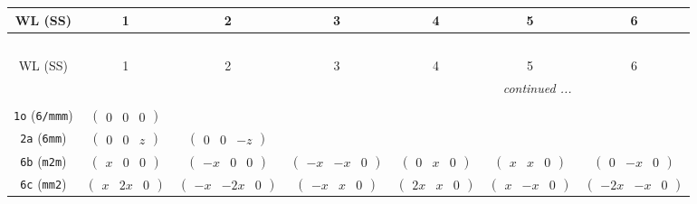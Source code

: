 \documentclass[fleqn,9pt,landscape]{jsarticle}
\begin{document}
\begin{center}
\renewcommand{\arraystretch}{1.2}
\begin{longtable}{ccccccc}
 \hline \hline
WL (SS) & 1 & 2 & 3 & 4 & 5 & 6 \\ \hline \endfirsthead

\multicolumn{6}{l}{\tablename\ \thetable{}} \\
 \hline \hline
WL (SS) & 1 & 2 & 3 & 4 & 5 & 6 \\ \hline \endhead

 \hline \hline
\multicolumn{6}{r}{\footnotesize\it continued ...} \\ \endfoot

 \hline \hline
\multicolumn{6}{r}{} \\ \endlastfoot

{\tt 1o} ({\tt 6/mmm}) & $ \begin{pmatrix} 0 & 0 & 0 \end{pmatrix} $ & $  $ & $  $ & $  $ & $  $ & $  $ \\ \hline
{\tt 2a} ({\tt 6mm}) & $ \begin{pmatrix} 0 & 0 & z \end{pmatrix} $ & $ \begin{pmatrix} 0 & 0 & - z \end{pmatrix} $ & $  $ & $  $ & $  $ & $  $ \\ \hline
{\tt 6b} ({\tt m2m}) & $ \begin{pmatrix} x & 0 & 0 \end{pmatrix} $ & $ \begin{pmatrix} - x & 0 & 0 \end{pmatrix} $ & $ \begin{pmatrix} - x & - x & 0 \end{pmatrix} $ & $ \begin{pmatrix} 0 & x & 0 \end{pmatrix} $ & $ \begin{pmatrix} x & x & 0 \end{pmatrix} $ & $ \begin{pmatrix} 0 & - x & 0 \end{pmatrix} $ \\ \hline
{\tt 6c} ({\tt mm2}) & $ \begin{pmatrix} x & 2 x & 0 \end{pmatrix} $ & $ \begin{pmatrix} - x & - 2 x & 0 \end{pmatrix} $ & $ \begin{pmatrix} - x & x & 0 \end{pmatrix} $ & $ \begin{pmatrix} 2 x & x & 0 \end{pmatrix} $ & $ \begin{pmatrix} x & - x & 0 \end{pmatrix} $ & $ \begin{pmatrix} - 2 x & - x & 0 \end{pmatrix} $ \\ \hline

\end{longtable}
\end{center}
\end{document}

